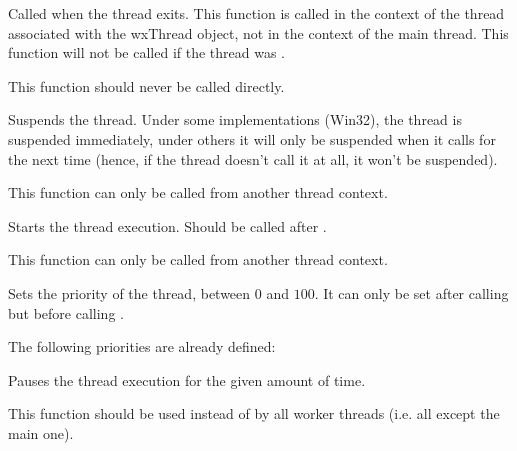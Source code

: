 
Called when the thread exits. This function is called in the context of the
thread associated with the wxThread object, not in the context of the main
thread. This function will not be called if the thread was
.

This function should never be called directly.


\label{wxthreadpause}


Suspends the thread. Under some implementations (Win32), the thread is
suspended immediately, under others it will only be suspended when it calls
 for the next time (hence, if the
thread doesn't call it at all, it won't be suspended).

This function can only be called from another thread context.


\label{wxthreadrun}


Starts the thread execution. Should be called after
.

This function can only be called from another thread context.


\label{wxthreadsetpriority}


Sets the priority of the thread, between $0$ and $100$. It can only be set
after calling  but before calling
.

The following priorities are already defined:

\twocolwidtha{7cm}
\begin{twocollist}\itemsep=0pt
\end{twocollist}


\label{wxthreadsleep}


Pauses the thread execution for the given amount of time.

This function should be used instead of  by all worker
threads (i.e. all except the main one).



